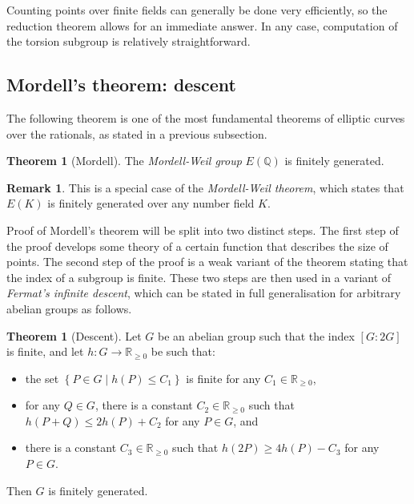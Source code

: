 \documentclass{article}
\newcommand{\Q}{\mathbb{Q}}
\newcommand{\R}{\mathbb{R}}
\newcommand{\rb}[1]{\left( #1 \right)}
\renewcommand{\sb}[1]{\left[ #1 \right]}
\newcommand{\cb}[1]{\left\{ #1 \right\}}
\theoremstyle{definition}\newtheorem*{definition}{Definition}
\theoremstyle{definition}\newtheorem*{example}{Example}
\theoremstyle{definition}\newtheorem*{remark}{Remark}
\newtheorem{theorem}[proposition]{Theorem}
\begin{document}
Counting points over finite fields can generally be done very efficiently, so the reduction theorem allows for an immediate answer. In any case, computation of the torsion subgroup is relatively straightforward.

\pagebreak

\subsection{Mordell's theorem: descent}

The following theorem is one of the most fundamental theorems of elliptic curves over the rationals, as stated in a previous subsection.

\begin{theorem}[Mordell]
\label{thm:mordell}
The \emph{Mordell-Weil group} $ E\rb{\Q} $ is finitely generated.
\end{theorem}

\begin{remark}
This is a special case of the \emph{Mordell-Weil theorem}, which states that $ E\rb{K} $ is finitely generated over any number field $ K $.
\end{remark}

Proof of Mordell's theorem will be split into two distinct steps. The first step of the proof develops some theory of a certain function that describes the size of points. The second step of the proof is a weak variant of the theorem stating that the index of a subgroup is finite. These two steps are then used in a variant of \emph{Fermat's infinite descent}, which can be stated in full generalisation for arbitrary abelian groups as follows.

\begin{theorem}[Descent]
Let $ G $ be an abelian group such that the index $ \sb{G : 2G} $ is finite, and let $ h : G \to \R_{\ge 0} $ be such that:
\begin{itemize}
\item the set $ \cb{P \in G \mid h\rb{P} \le C_1} $ is finite for any $ C_1 \in \R_{\ge 0} $,
\item for any $ Q \in G $, there is a constant $ C_2 \in \R_{\ge 0} $ such that $ h\rb{P + Q} \le 2h\rb{P} + C_2 $ for any $ P \in G $, and
\item there is a constant $ C_3 \in \R_{\ge 0} $ such that $ h\rb{2P} \ge 4h\rb{P} - C_3 $ for any $ P \in G $.
\end{itemize}
Then $ G $ is finitely generated.
\end{theorem}
\end{document}
